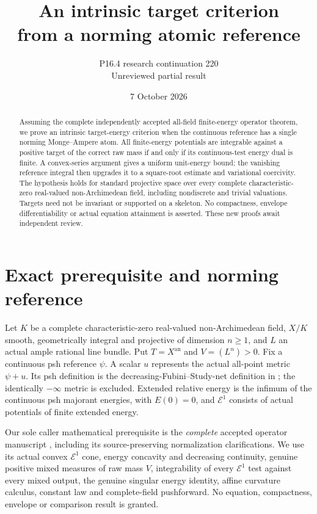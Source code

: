 \documentclass[11pt]{article}
\title{An intrinsic target criterion\\from a norming atomic reference}
\author{P16.4 research continuation 220\\Unreviewed partial result}
\date{7 October 2026}
\newcommand{\E}{\mathcal E}
\begin{document}
\maketitle
\begin{abstract}
Assuming the complete independently accepted all-field finite-energy
operator theorem, we prove an intrinsic target-energy criterion when
the continuous reference has a single norming Monge--Ampere atom.
All finite-energy potentials are integrable against a positive target
of the correct raw mass if and only if its continuous-test energy
dual is finite. A convex-series argument gives a uniform unit-energy
bound; the vanishing reference integral then upgrades it to a
square-root estimate and variational coercivity. The hypothesis holds
for standard projective space over every complete characteristic-zero
real-valued non-Archimedean field, including nondiscrete and trivial
valuations. Targets need not be invariant or supported on a skeleton.
No compactness, envelope differentiability or actual equation
attainment is asserted. These new proofs await independent review.
\end{abstract}

\section{Exact prerequisite and norming reference}

Let $K$ be a complete characteristic-zero real-valued
non-Archimedean field, $X/K$ smooth, geometrically integral and
projective of dimension $n\geq1$, and $L$ an actual ample rational
line bundle. Put $T=X^{\mathrm{an}}$ and $V=(L^n)>0$.
Fix a continuous psh reference $\psi$. A scalar $u$ represents the
actual all-point metric $\psi+u$. Its psh definition is the
decreasing-Fubini--Study-net definition in
\cite[Definition 7.2]{BE}; the identically $-\infty$ metric is excluded.
Extended relative energy is the infimum of the continuous psh
majorant energies, with $E(0)=0$, and $\E^1$ consists of actual
potentials of finite extended energy.

Our sole caller mathematical prerequisite is the \emph{complete}
accepted operator manuscript \cite{O}, including its source-preserving
normalization clarifications. We use its actual convex $\E^1$ cone,
energy concavity and decreasing continuity, genuine positive mixed
measures of raw mass $V$, integrability of every $\E^1$ test against
every mixed output, the genuine singular energy identity, affine
curvature calculus, constant law and complete-field pushforward.
No equation, compactness, envelope or comparison result is granted.
\end{document}
